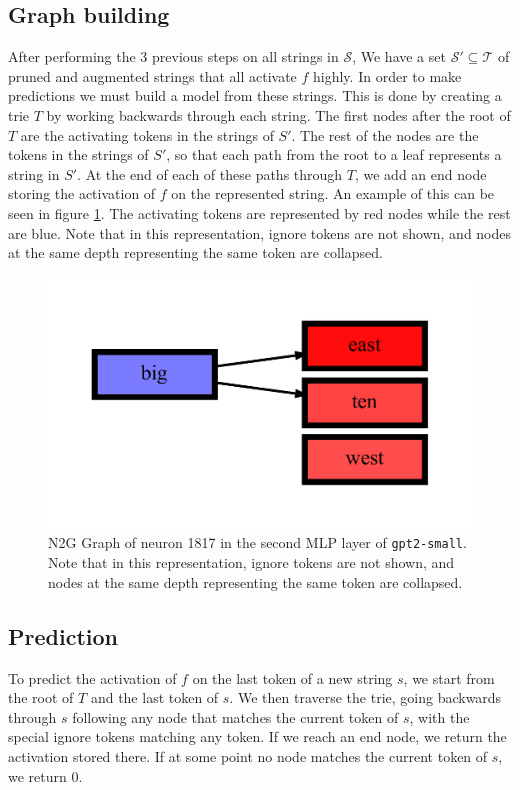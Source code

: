 \subsection{Graph building}
After performing the 3 previous steps on all strings in $\mathcal S$, 
We have a set $\mathcal S'\subseteq\mathcal T$ 
of pruned and augmented strings that all activate $f$ highly.
In order to make predictions we must build a model from these strings.
This is done by creating a trie $T$ 
by working backwards through each string.
The first nodes after the root of $T$ are the activating tokens 
in the strings of $S'$.
The rest of the nodes are the tokens in the strings of $S'$, 
so that each path from the root to a leaf represents a string in $S'$.
At the end of each of these paths through $T$, 
we add an end node storing the activation of $f$ on the represented string.
An example of this can be seen in figure \ref{fig:n2g_graph_gpt2-small_2_1817}.
The activating tokens are represented by red nodes while the rest are blue.
Note that in this representation, ignore tokens are not shown, and nodes at the same depth representing the same token are collapsed.

\begin{figure}[ht]
    \centering
    \includegraphics[width=\textwidth]{images/gpt2-small_2_1817.pdf}
    \caption{N2G Graph of neuron 1817 in the second \ac{MLP} layer of \texttt{gpt2-small}. 
    Note that in this representation, ignore tokens are not shown, and nodes at the same depth representing the same token are collapsed.}
    \label{fig:n2g_graph_gpt2-small_2_1817}
\end{figure}

\subsection{Prediction}
To predict the activation of $f$ on the last token of a new string $s$, 
we start from the root of $T$ and the last token of $s$.
We then traverse the trie, going backwards through $s$ 
following any node that matches the current token of $s$, 
with the special ignore tokens matching any token.
If we reach an end node, we return the activation stored there.
If at some point no node matches the current token of $s$, 
we return $0$.

